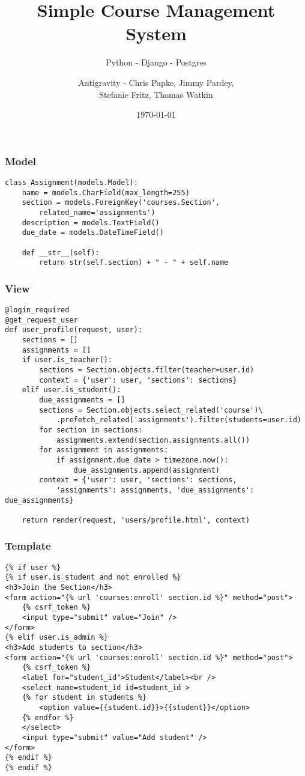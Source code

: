 \documentclass{beamer}
\begin{document}
\title[Group Project]{Simple Course Management System}
\subtitle{Python - Django - Postgres}
\author{Antigravity - Chris Papke, Jimmy Pardey, \\Stefanie Fritz, Thomas Watkin}
\date{\today}

\begin{frame}[plain]
\titlepage
\end{frame}

\begin{frame}[fragile]
\frametitle{Model}

\begin{lstlisting}[basicstyle=\small]
class Assignment(models.Model):
    name = models.CharField(max_length=255)
    section = models.ForeignKey('courses.Section', 
        related_name='assignments')
    description = models.TextField()
    due_date = models.DateTimeField()

    def __str__(self):
        return str(self.section) + " - " + self.name
\end{lstlisting}
\end{frame}

\begin{frame}[fragile]
\frametitle{View}

\begin{lstlisting}[basicstyle=\tiny]
@login_required
@get_request_user
def user_profile(request, user):
    sections = []
    assignments = []
    if user.is_teacher():
        sections = Section.objects.filter(teacher=user.id)
        context = {'user': user, 'sections': sections}
    elif user.is_student():
        due_assignments = []
        sections = Section.objects.select_related('course')\
            .prefetch_related('assignments').filter(students=user.id)
        for section in sections:
            assignments.extend(section.assignments.all())
        for assignment in assignments:
            if assignment.due_date > timezone.now():
                due_assignments.append(assignment)
        context = {'user': user, 'sections': sections, 
            'assignments': assignments, 'due_assignments': due_assignments}

    return render(request, 'users/profile.html', context)  
\end{lstlisting}
\end{frame}


\begin{frame}[fragile]
\frametitle{Template}

\begin{lstlisting}[basicstyle=\tiny]
{% if user %}
{% if user.is_student and not enrolled %}
<h3>Join the Section</h3>
<form action="{% url 'courses:enroll' section.id %}" method="post">
    {% csrf_token %}
    <input type="submit" value="Join" />
</form>
{% elif user.is_admin %}
<h3>Add students to section</h3>
<form action="{% url 'courses:enroll' section.id %}" method="post">
    {% csrf_token %}
    <label for="student_id">Student</label><br />
    <select name=student_id id=student_id >
    {% for student in students %}
        <option value={{student.id}}>{{student}}</option>
    {% endfor %}
    </select>
    <input type="submit" value="Add student" />
</form>
{% endif %}
{% endif %}  
\end{lstlisting}
\end{frame}
\end{document}
